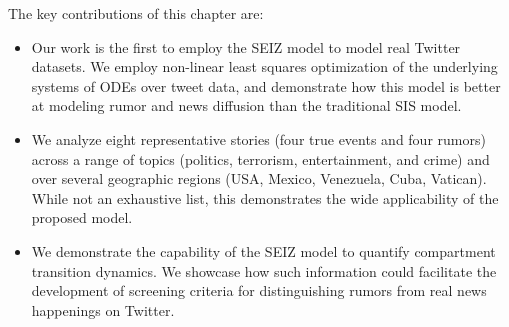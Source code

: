 
The key contributions of this chapter are:

\begin{itemize}
\item Our work is the first to employ the SEIZ model to model real Twitter
datasets. We employ non-linear least squares optimization of the underlying
systems of ODEs over
tweet data, and demonstrate how this model is better at modeling
rumor and news diffusion
than the traditional SIS model.
\item We analyze
eight representative stories (four true events and
four rumors) across a range of topics (politics, terrorism, entertainment, and crime) and over several
geographic regions (USA, Mexico, Venezuela, Cuba, Vatican). While not
an exhaustive list, this demonstrates the wide applicability of the
proposed model.
\item We demonstrate the capability of the SEIZ model to quantify
compartment transition dynamics. We showcase how such information
could facilitate the development of screening criteria for distinguishing rumors from real news happenings on Twitter.

\end{itemize}



